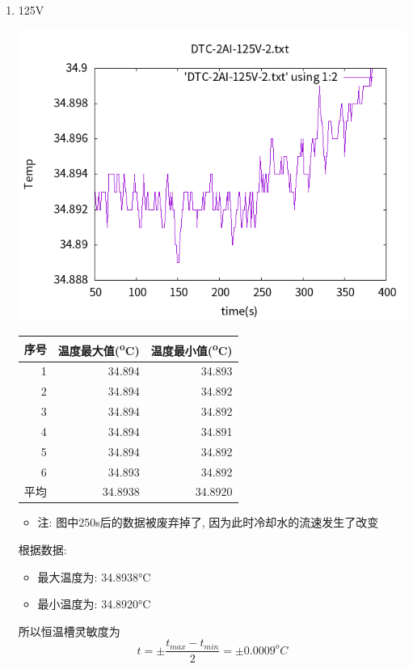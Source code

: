 \documentclass[11pt]{report}
\begin{document}
\begin{enumerate}
\item 125V
\label{sec:org3d3c800}
\begin{center}
\includegraphics[width=.9\linewidth]{../img/DTC-2AI-125V-2.txt.png}
\end{center}
\begin{center}
\begin{tabular}{rrr}
序号 & 温度最大值(\textsuperscript{o}C) & 温度最小值(\textsuperscript{o}C)\\
\hline
1 & 34.894 & 34.893\\
2 & 34.894 & 34.892\\
3 & 34.894 & 34.892\\
4 & 34.894 & 34.891\\
5 & 34.894 & 34.892\\
6 & 34.893 & 34.892\\
平均 & 34.8938 & 34.8920\\
\end{tabular}
\end{center}

\begin{itemize}
\item 注: 图中250s后的数据被废弃掉了, 因为此时冷却水的流速发生了改变
\end{itemize}

根据数据:
\begin{itemize}
\item 最大温度为: 34.8938°C
\item 最小温度为: 34.8920°C
\end{itemize}
所以恒温槽灵敏度为
\[
t=\pm\frac{t_{max}-t_{min}}{2}=\pm 0.0009^{o}C
\]
\end{enumerate}
\end{document}
